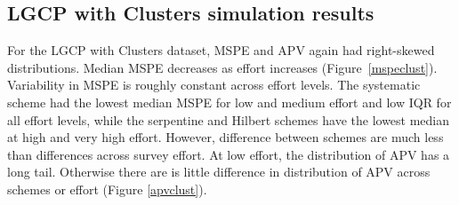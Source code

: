 \documentclass[review]{elsarticle}
\begin{document}
%
%
%


\subsection{LGCP with Clusters simulation results}

For the LGCP with Clusters dataset, MSPE and APV again had right-skewed
distributions. Median MSPE decreases as effort increases
(Figure~\ref{mspeclust}). Variability in MSPE is roughly constant across effort
levels. The systematic scheme had the lowest median MSPE for low and medium
effort and low IQR for all effort levels, while the serpentine and Hilbert
schemes have the lowest median at high and very high effort. However,
difference between schemes are much less than differences across survey effort.
At low effort, the distribution of APV has a long tail. Otherwise there are
is little difference in distribution of APV across schemes or effort
(Figure \ref{apvclust}).
\end{document}
